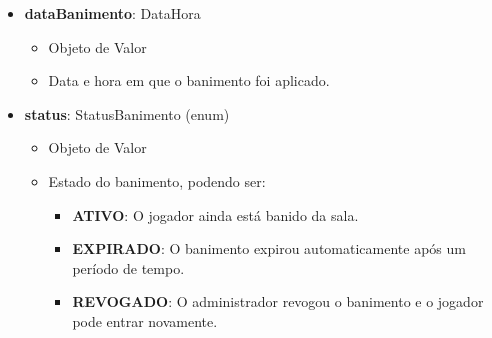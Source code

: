 \begin{itemize}
        \item \textbf{dataBanimento}: DataHora  
              \begin{itemize}
                  \item Objeto de Valor
                  \item Data e hora em que o banimento foi aplicado.
              \end{itemize}
    
        \item \textbf{status}: StatusBanimento (enum)  
              \begin{itemize}
                  \item Objeto de Valor
                  \item Estado do banimento, podendo ser:
                  \begin{itemize}
                      \item \textbf{ATIVO}: O jogador ainda está banido da sala.
                      \item \textbf{EXPIRADO}: O banimento expirou automaticamente após um período de tempo.
                      \item \textbf{REVOGADO}: O administrador revogou o banimento e o jogador pode entrar novamente.
                  \end{itemize}
              \end{itemize}
    \end{itemize}

